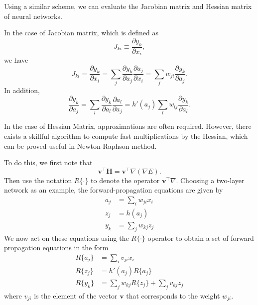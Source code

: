 \documentclass[a4paper]{book}
\renewcommand{\bf}{\mathbf}
\begin{document}
Using a similar scheme, we can evaluate the Jacobian matrix and Hessian matrix of neural networks.

In the case of Jacobian matrix, which is defined as
\begin{equation}
	J_{ki} \equiv \frac{\partial y_k}{\partial x_i},
\end{equation}
we have 
\begin{equation}
	J_{ki} = \frac{\partial y_k}{\partial x_i} = \sum_j \frac{\partial y_k}{\partial a_j} \frac{\partial a_j}{\partial x_i}=\sum_j w_{ji} \frac{\partial y_k}{\partial a_j}.
\end{equation}
In addition,
\begin{equation}
	\frac{\partial y_k}{\partial a_j} = \sum_l \frac{\partial y_k}{\partial a_l}\frac{\partial a_l}{\partial a_j} = h'(a_j)\sum_l w_{lj}\frac{\partial y_k}{\partial a_l}.
\end{equation}

In the case of Hessian Matrix, approximations are often required. However, there exists a skillful algorithm to compute fast multiplications by the Hessian, which can be proved useful in Newton-Raphson method.

To do this, we first note that
\begin{equation}
	\bf{v}^{\intercal}\bf{H} = \bf{v}^{\intercal}\nabla (\nabla E).
\end{equation}
Then use the notation $R\{\cdot\}$ to denote the operator $\bf{v}^{\intercal} \nabla$. Choosing a two-layer network as an example, the forward-propagation equations are given by
\begin{align}
	a_j &= \sum_i w_{ji}x_i \\
	z_j &= h(a_j)\\
	y_k &= \sum_j w_{kj} z_j
\end{align}
We now act on these equations using the $R\{\cdot \}$ operator to obtain a set of forward propagation equations in the form
\begin{align}
	R\{ a_j\} &= \sum_i v_{ji} x_i \\
	R\{ z_j\} &= h'(a_j) R\{a_j\}\\
	R\{y_k\}  &= \sum_j w_{kj} R\{z_j\} + \sum_j v_{kj} z_j
\end{align}
where $v_{ji}$ is the element of the vector $\bf{v}$ that corresponds to the weight $w_{ji}$.
\end{document}
